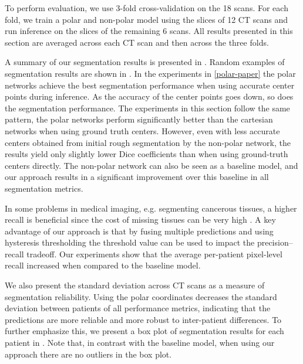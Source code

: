 To perform evaluation, we use 3-fold cross-validation on the 18 scans. For each fold, we train a polar and non-polar model using the slices of 12 CT scans and run inference on the slices of the remaining 6 scans. All results presented in this section are averaged across each CT scan and then across the three folds.

A summary of our segmentation results is presented in . Random examples of segmentation results are shown in . In the experiments in \ref{polar-paper} the polar networks achieve the best segmentation performance when using accurate center points during inference. As the accuracy of the center points goes down, so does the segmentation performance. The experiments in this section follow the same pattern, the polar networks perform significantly better than the cartesian networks when using ground truth centers. However, even with less accurate centers obtained from initial rough segmentation by the non-polar network, the results yield only slightly lower Dice coefficients than when using ground-truth centers directly. The non-polar network can also be seen as a baseline model, and our approach results in a significant improvement over this baseline in all segmentation metrics.

In some problems in medical imaging, e.g. segmenting cancerous tissues, a higher recall is beneficial since the cost of missing tissues can be very high \cite{tahaMetricsEvaluating3D2015}. A key advantage of our approach is that by fusing multiple predictions and using hysteresis thresholding the threshold value can be used to impact the precision--recall tradeoff. Our experiments show that the average per-patient pixel-level recall increased when compared to the baseline model.

We also present the standard deviation across CT scans as a measure of segmentation reliability. Using the polar coordinates decreases the standard deviation between patients of all performance metrics, indicating that the predictions are more reliable and more robust to inter-patient differences. To further emphasize this, we present a box plot of segmentation results for each patient in . Note that, in contrast with the baseline model, when using our approach there are no outliers in the box plot.

